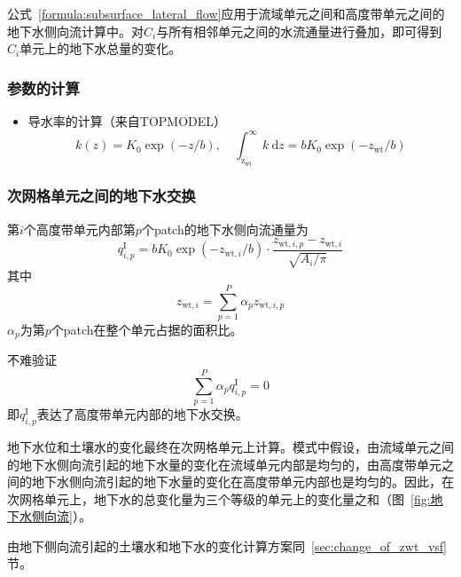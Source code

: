 公式~\eqref{formula:subsurface_lateral_flow}应用于流域单元之间和高度带单元之间的地下水侧向流计算中。对$C_i$与所有相邻单元之间的水流通量进行叠加，即可得到$C_i$单元上的地下水总量的变化。

\subsubsection{参数的计算}
\begin{itemize}
  \item 导水率的计算（来自TOPMODEL）
    \begin{equation}
      k(z) = K_0\exp{(- z/b)},\quad \int^\infty_{\mathrm{z_{wt}}} k\ \mathrm{d}z = b K_0\exp{(-z_{\mathrm{wt}}/b)}
    \end{equation}
\end{itemize}

\subsubsection{次网格单元之间的地下水交换}
第$i$个高度带单元内部第$p$个patch的地下水侧向流通量为
\begin{equation}
  q^{\mathrm{I}}_{i,p} = b K_0 \exp{(-z_{\mathrm{wt},i}/b)}\cdot\frac{z_{\mathrm{wt},i,p}-z_{\mathrm{wt},i}}{\sqrt{A_i/\pi}}
\end{equation}
其中
$$z_{\mathrm{wt},i} = \sum^P_{p=1} \alpha_{p}  z_{\mathrm{wt},i,p}$$
$\alpha_{p} $为第$p$个patch在整个单元占据的面积比。

不难验证
$$\sum^P_{p=1} \alpha_{p}  q^{\mathrm{I}}_{i,p} =0$$
即$q^{\mathrm{I}}_{i,p}$表达了高度带单元内部的地下水交换。

地下水位和土壤水的变化最终在次网格单元上计算。模式中假设，由流域单元之间的地下水侧向流引起的地下水量的变化在流域单元内部是均匀的，由高度带单元之间的地下水侧向流引起的地下水量的变化在高度带单元内部也是均匀的。因此，在次网格单元上，地下水的总变化量为三个等级的单元上的变化量之和（图~\ref{fig:地下水侧向流}）。

由地下侧向流引起的土壤水和地下水的变化计算方案同~\ref{sec:change_of_zwt_vsf}节。



